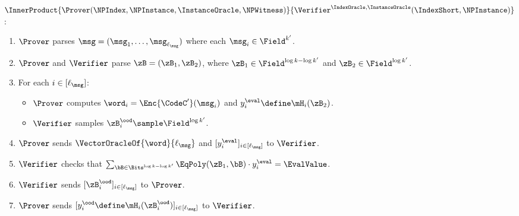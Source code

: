     \begin{tcolorbox}[breakable, enhanced, colback=white, boxrule=0.65pt]
        \noindent
        $\InnerProduct{\Prover(\NPIndex, \NPInstance, \InstanceOracle, \NPWitness)}{\Verifier^{\IndexOracle, \InstanceOracle}(\IndexShort, \NPInstance)}$:

        \begin{enumerate}[nolistsep]
        \item $\Prover$ parses $\msg = (\msg_1, \dotsc, \msg_{\ell_{\msg}})$ where each $\msg_i \in \Field^{k'}$.
        \item $\Prover$ and $\Verifier$ parse $\zB = (\zB_1, \zB_2)$, where $\zB_1 \in \Field^{\log k - \log k'}$ and $\zB_2 \in \Field^{\log k'}$.
        \item For each $i \in [\ell_{\msg}]$:
        \begin{itemize}[nolistsep]
            \item $\Prover$ computes $\word_i = \Enc{\CodeC'}(\msg_i)$ and $y^{\eval}_i \define \mH_i(\zB_2)$.
            \item $\Verifier$ samples $\zB^{\ood}_i \sample \Field^{\log k'}$.
        \end{itemize}
        \item $\Prover$ sends $\VectorOracleOf{\word}{\ell_{\msg}}$ and $[y^{\eval}_i]_{i \in [\ell_{\msg}]}$ to $\Verifier$.
        \item $\Verifier$ checks that $\sum_{\bB \in \Bits^{\log k - \log k'}} \EqPoly(\zB_1,\bB) \cdot y^{\eval}_i = \EvalValue$.
        \item $\Verifier$ sends $[\zB^{\ood}_i]_{i \in [\ell_{\msg}]}$ to $\Prover$.
        \item $\Prover$ sends $[y^{\ood}_i \define \mH_i(\zB^{\ood}_i)]_{i \in [\ell_{\msg}]}$ to $\Verifier$.
        \end{enumerate}
        

\end{tcolorbox}
